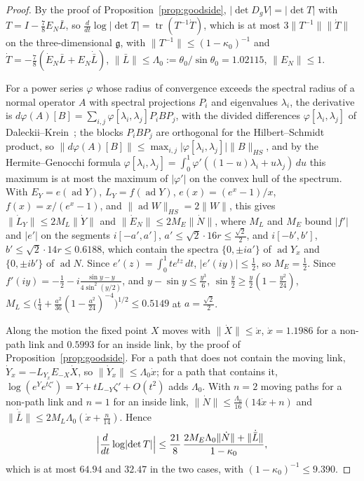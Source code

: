 \documentclass[11pt]{amsart}
\theoremstyle{definition}
\theoremstyle{remark}
\numberwithin{equation}{section}
\newcommand{\g}{\mathfrak{g}}
\begin{document}
\begin{proof}
By the proof of Proposition~\ref{prop:goodside}, $\lvert\det D_gV\rvert=
\lvert\det T\rvert$ with $T=I-\frac78E_N\bar L$, so $\frac d{dt}\log
\lvert\det T\rvert=\operatorname{tr}(T^{-1}\dot T)$, which is at most
$3\lVert T^{-1}\rVert\lVert\dot T\rVert$ on the three-dimensional $\g$, with
$\lVert T^{-1}\rVert\le(1-\kappa_0)^{-1}$ and $\dot T=-\frac78(\dot E_N\bar L
+E_N\dot{\bar L})$, $\lVert\bar L\rVert\le\Lambda_0:=\theta_0/\sin\theta_0
=1.02115$, $\lVert E_N\rVert\le1$.

For a power series $\varphi$ whose radius of convergence exceeds the
spectral radius of a normal operator $A$ with spectral projections $P_i$
and eigenvalues $\lambda_i$, the derivative is
$d\varphi(A)[B]=\sum_{i,j}\varphi[\lambda_i,\lambda_j]P_iBP_j$, with the
divided differences $\varphi[\lambda_i,\lambda_j]$ of
Daleckii--Krein~\cite{DK65}; the blocks $P_iBP_j$ are orthogonal for the
Hilbert--Schmidt product, so $\lVert d\varphi(A)[B]\rVert\le\max_{i,j}
\lvert\varphi[\lambda_i,\lambda_j]\rvert\lVert B\rVert_{HS}$, and by the
Hermite--Genocchi formula $\varphi[\lambda_i,\lambda_j]=\int_0^1\varphi'(
(1-u)\lambda_i+u\lambda_j)\,du$ this maximum is at most the maximum of
$\lvert\varphi'\rvert$ on the convex hull of the spectrum. With
$E_Y=e(\operatorname{ad}Y)$, $L_Y=f(\operatorname{ad}Y)$, $e(x)=(e^x-1)/x$,
$f(x)=x/(e^x-1)$, and $\lVert\operatorname{ad}W\rVert_{HS}=2\lVert W\rVert$,
this gives $\lVert\dot L_{Y}\rVert\le2M_L\lVert\dot Y\rVert$ and
$\lVert\dot E_N\rVert\le2M_E\lVert\dot N\rVert$, where $M_L$ and $M_E$ bound
$\lvert f'\rvert$ and $\lvert e'\rvert$ on the segments $i[-a',a']$,
$a'\le\sqrt2\cdot16r\le\frac{\sqrt2}2$, and $i[-b',b']$,
$b'\le\sqrt2\cdot14r\le0.6188$, which contain the spectra $\{0,\pm ia'\}$
of $\operatorname{ad}Y_x$ and $\{0,\pm ib'\}$ of $\operatorname{ad}N$. Since
$e'(z)=\int_0^1te^{tz}\,dt$, $\lvert e'(iy)\rvert\le\frac12$, so $M_E=\frac12$.
Since $f'(iy)=-\frac12-i\frac{\sin y-y}{4\sin^2(y/2)}$, and $y-\sin y\le
\frac{y^3}6$, $\sin\frac y2\ge\frac y2(1-\frac{y^2}{24})$,
$M_L\le\bigl(\frac14+\frac{a^2}{36}(1-\frac{a^2}{24})^{-4}\bigr)^{1/2}\le
0.5149$ at $a=\frac{\sqrt2}2$.

Along the motion the fixed point $X$ moves with $\lVert\dot X\rVert\le\dot x$,
$\dot x=1.1986$ for a non-path link and $0.5993$ for an inside link, by the
proof of Proposition~\ref{prop:goodside}. For a path that does not contain
the moving link, $\dot Y_x=-L_{Y_x}E_{-X}\dot X$, so $\lVert\dot Y_x\rVert\le
\Lambda_0\dot x$; for a path that contains it, $\log(e^Ye^{t\zeta'})=Y+
tL_{-Y}\zeta'+O(t^2)$ adds $\Lambda_0$. With $n=2$ moving paths for a
non-path link and $n=1$ for an inside link, $\lVert\dot N\rVert\le
\frac{\Lambda_0}{16}(14\dot x+n)$ and $\lVert\dot{\bar L}\rVert\le2M_L
\Lambda_0(\dot x+\frac n{14})$. Hence
\[
\Bigl|\frac d{dt}\log\lvert\det T\rvert\Bigr|\le\frac{21}8\,
\frac{2M_E\Lambda_0\lVert\dot N\rVert+\lVert\dot{\bar L}\rVert}{1-\kappa_0},
\]
which is at most $64.94$ and $32.47$ in the two cases, with
$(1-\kappa_0)^{-1}\le9.390$.
\end{proof}
\end{document}
